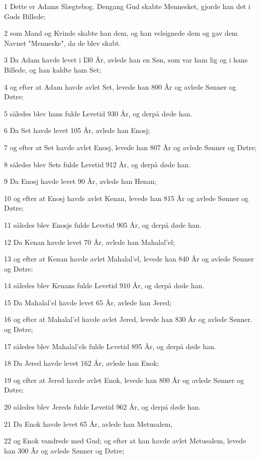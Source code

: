 \par 1 Dette er Adams Slægtebog. Dengang Gud skabte Mennesket, gjorde han det i Guds Billede;
\par 2 som Mand og Kvinde skabte han dem, og han velsignede dem og gav dem Navnet "Menneske", da de blev skabt.
\par 3 Da Adam havde levet i I30 År, avlede han en Søn, som var ham lig og i hans Billede, og han kaldte ham Set;
\par 4 og efter at Adam havde avlet Set, levede han 800 År og avlede Sønner og Døtre;
\par 5 således blev hans fulde Levetid 930 År, og derpå døde han.
\par 6 Da Set havde levet 105 År, avlede han Enosj;
\par 7 og efter at Set havde avlet Enosj, levede han 807 År og avlede Sønner og Døtre;
\par 8 således blev Sets fulde Levetid 912 År, og derpå døde han.
\par 9 Da Enosj havde levet 90 År, avlede han Henan;
\par 10 og efter at Enosj havde avlet Kenan, levede han 815 År og avlede Sønner og Døtre;
\par 11 således blev Enosjs fulde Levetid 905 År, og derpå døde han.
\par 12 Da Kenan havde levet 70 År, avlede han Mahalal'el;
\par 13 og efter at Kenan havde avlet Mahalal'el, levede han 840 År og avlede Sønner og Døtre;
\par 14 således blev Kenans fulde Levetid 910 År, og derpå døde han.
\par 15 Da Mahalal'el havde levet 65 År, avlede han Jered;
\par 16 og efter at Mahalal'el havde avlet Jered, levede han 830 År og avlede Sønner. og Døtre;
\par 17 således blev Mahalal'els fulde Levetid 895 År, og derpå døde han.
\par 18 Da Jered havde levet 162 År, avlede han Enok;
\par 19 og efter at Jered havde avlet Enok, levede han 800 År og avlede Sønner og Døtre;
\par 20 således blev Jereds fulde Levetid 962 År, og derpå døde han.
\par 21 Da Enok havde levet 65 År, avlede han Metusalem,
\par 22 og Enok vandrede med Gud; og efter at han havde avlet Metusalem, levede han 300 År og avlede Sønner og Døtre;
